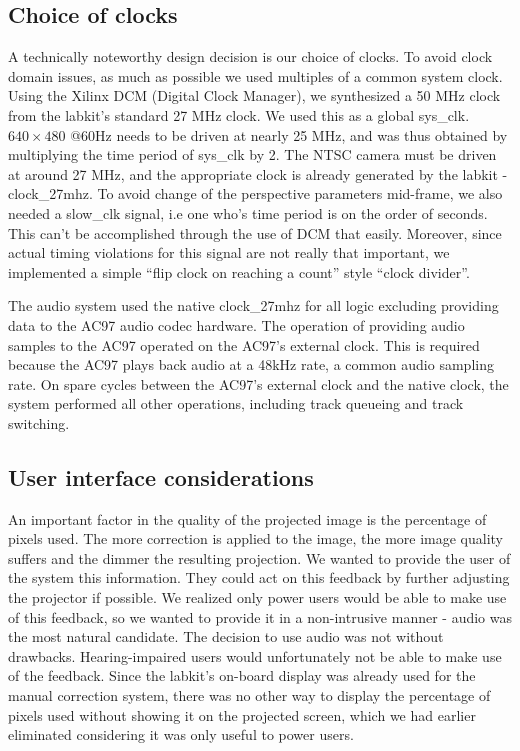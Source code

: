 \documentclass{article}
\begin{document}
\subsection{Choice of clocks}
A technically noteworthy design decision is our choice of clocks.
To avoid clock domain issues, as much as possible we used multiples of a common system clock.
Using the Xilinx DCM (Digital Clock Manager), we synthesized a 50 MHz clock from the labkit's standard 27 MHz clock.
We used this as a global sys\_clk.
$640 \times 480$ @60Hz needs to be driven at nearly 25 MHz, and was thus obtained by multiplying the time period of sys\_clk by 2.
The NTSC camera must be driven at around 27 MHz, and the appropriate clock is already generated by the labkit - clock\_27mhz.
To avoid change of the perspective parameters mid-frame, we also needed a slow\_clk signal,
i.e one who's time period is on the order of seconds.
This can't be accomplished through the use of DCM that easily.
Moreover, since actual timing violations for this signal are not really that important,
we implemented a simple ``flip clock on reaching a count'' style ``clock divider''.

The audio system used the native clock\_27mhz for all logic excluding providing data to the AC97 audio codec hardware.
The operation of providing audio samples to the AC97 operated on the AC97's external clock.
This is required because the AC97 plays back audio at a 48kHz rate, a common audio sampling rate.
On spare cycles between the AC97's external clock and the native clock, the system performed all other operations, including track queueing and track switching.

\subsection{User interface considerations}
An important factor in the quality of the projected image is the percentage of pixels used.
The more correction is applied to the image, the more image quality suffers and the dimmer the resulting projection.
We wanted to provide the user of the system this information.
They could act on this feedback by further adjusting the projector if possible.
We realized only power users would be able to make use of this feedback, so we wanted to provide it in a non-intrusive manner - audio was the most natural candidate.
The decision to use audio was not without drawbacks.
Hearing-impaired users would unfortunately not be able to make use of the feedback.
Since the labkit's on-board display was already used for the manual correction system,
there was no other way to display the percentage of pixels used without showing it on the projected screen,
which we had earlier eliminated considering it was only useful to power users.
\end{document}
